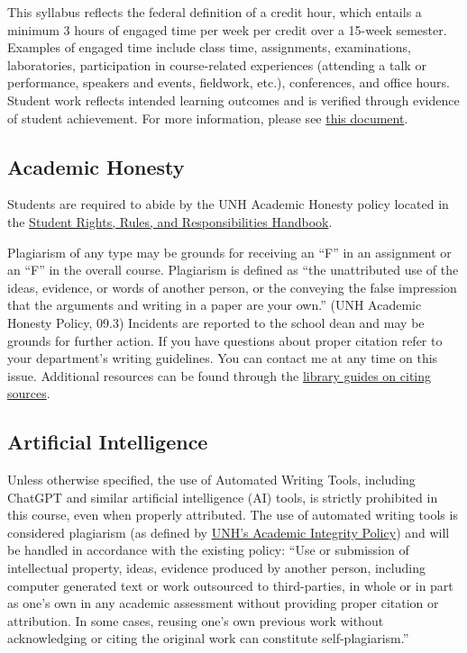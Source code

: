 \documentclass[
  letterpaper,
  DIV=11,
  numbers=noendperiod]{scrreprt}
\begin{document}
This syllabus reflects the federal definition of a credit hour, which
entails a minimum 3 hours of engaged time per week per credit over a
15-week semester. Examples of engaged time include class time,
assignments, examinations, laboratories, participation in course-related
experiences (attending a talk or performance, speakers and events,
fieldwork, etc.), conferences, and office hours. Student work reflects
intended learning outcomes and is verified through evidence of student
achievement. For more information, please see
\href{https://www.neche.org/wp-content/uploads/2018/12/Pp111_Policy_On_Credits-And-Degrees.pdf}{this
document}.

\hypertarget{academic-honesty}{%
\subsection*{Academic Honesty}\label{academic-honesty}}

Students are required to abide by the UNH Academic Honesty policy
located in the \href{https://catalog.unh.edu/srrr/}{Student Rights,
Rules, and Responsibilities Handbook}.

Plagiarism of any type may be grounds for receiving an ``F'' in an
assignment or an ``F'' in the overall course. Plagiarism is defined as
``the unattributed use of the ideas, evidence, or words of another
person, or the conveying the false impression that the arguments and
writing in a paper are your own.'' (UNH Academic Honesty Policy, 09.3)
Incidents are reported to the school dean and may be grounds for further
action. If you have questions about proper citation refer to your
department's writing guidelines. You can contact me at any time on this
issue. Additional resources can be found through the
\href{http://libraryguides.unh.edu/unhmcitingsources}{library guides on
citing sources}.

\hypertarget{artificial-intelligence}{%
\subsection*{Artificial Intelligence}\label{artificial-intelligence}}

Unless otherwise specified, the use of Automated Writing Tools,
including ChatGPT and similar artificial intelligence (AI) tools, is
strictly prohibited in this course, even when properly attributed. The
use of automated writing tools is considered plagiarism (as defined by
\href{https://catalog.unh.edu/srrr/university-policies-regulations/academic-integrity/}{UNH's
Academic Integrity Policy}) and will be handled in accordance with the
existing policy: ``Use or submission of intellectual property, ideas,
evidence produced by another person, including computer generated text
or work outsourced to third-parties, in whole or in part as one's own in
any academic assessment without providing proper citation or
attribution. In some cases, reusing one's own previous work without
acknowledging or citing the original work can constitute
self-plagiarism.''
\end{document}
